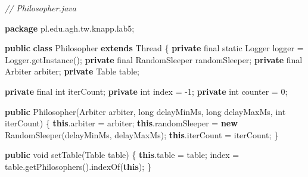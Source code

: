 \documentclass[11pt]{article}
\newenvironment{Shaded}{}{}
\newcommand{\KeywordTok}[1]{\textcolor[rgb]{0.00,0.44,0.13}{\textbf{{#1}}}}
\newcommand{\DataTypeTok}[1]{\textcolor[rgb]{0.56,0.13,0.00}{{#1}}}
\newcommand{\DecValTok}[1]{\textcolor[rgb]{0.25,0.63,0.44}{{#1}}}
\newcommand{\CommentTok}[1]{\textcolor[rgb]{0.38,0.63,0.69}{\textit{{#1}}}}
\newcommand{\FunctionTok}[1]{\textcolor[rgb]{0.02,0.16,0.49}{{#1}}}
\newcommand{\NormalTok}[1]{{#1}}
\newcommand{\ImportTok}[1]{{#1}}
\newcommand{\OperatorTok}[1]{\textcolor[rgb]{0.40,0.40,0.40}{{#1}}}
\newcommand{\BuiltInTok}[1]{{#1}}
\begin{document}
\begin{Shaded}
\begin{Highlighting}[]
\CommentTok{// Philosopher.java}

\KeywordTok{package}\ImportTok{ pl}\OperatorTok{.}\ImportTok{edu}\OperatorTok{.}\ImportTok{agh}\OperatorTok{.}\ImportTok{tw}\OperatorTok{.}\ImportTok{knapp}\OperatorTok{.}\ImportTok{lab5}\OperatorTok{;}

\KeywordTok{public} \KeywordTok{class}\NormalTok{ Philosopher }\KeywordTok{extends} \BuiltInTok{Thread} \OperatorTok{\{}
    \KeywordTok{private} \DataTypeTok{final} \DataTypeTok{static} \BuiltInTok{Logger}\NormalTok{ logger }\OperatorTok{=} \BuiltInTok{Logger}\OperatorTok{.}\FunctionTok{getInstance}\OperatorTok{();}
    \KeywordTok{private} \DataTypeTok{final}\NormalTok{ RandomSleeper randomSleeper}\OperatorTok{;}
    \KeywordTok{private} \DataTypeTok{final}\NormalTok{ Arbiter arbiter}\OperatorTok{;}
    \KeywordTok{private}\NormalTok{ Table table}\OperatorTok{;}

    \KeywordTok{private} \DataTypeTok{final} \DataTypeTok{int}\NormalTok{ iterCount}\OperatorTok{;}
    \KeywordTok{private} \DataTypeTok{int}\NormalTok{ index }\OperatorTok{=} \OperatorTok{{-}}\DecValTok{1}\OperatorTok{;}
    \KeywordTok{private} \DataTypeTok{int}\NormalTok{ counter }\OperatorTok{=} \DecValTok{0}\OperatorTok{;}

    \KeywordTok{public} \FunctionTok{Philosopher}\OperatorTok{(}\NormalTok{Arbiter arbiter}\OperatorTok{,} \DataTypeTok{long}\NormalTok{ delayMinMs}\OperatorTok{,} \DataTypeTok{long}\NormalTok{ delayMaxMs}\OperatorTok{,} \DataTypeTok{int}\NormalTok{ iterCount}\OperatorTok{)} \OperatorTok{\{}
        \KeywordTok{this}\OperatorTok{.}\FunctionTok{arbiter} \OperatorTok{=}\NormalTok{ arbiter}\OperatorTok{;}
        \KeywordTok{this}\OperatorTok{.}\FunctionTok{randomSleeper} \OperatorTok{=} \KeywordTok{new} \FunctionTok{RandomSleeper}\OperatorTok{(}\NormalTok{delayMinMs}\OperatorTok{,}\NormalTok{ delayMaxMs}\OperatorTok{);}
        \KeywordTok{this}\OperatorTok{.}\FunctionTok{iterCount} \OperatorTok{=}\NormalTok{ iterCount}\OperatorTok{;}
    \OperatorTok{\}}

    \KeywordTok{public} \DataTypeTok{void} \FunctionTok{setTable}\OperatorTok{(}\NormalTok{Table table}\OperatorTok{)} \OperatorTok{\{}
        \KeywordTok{this}\OperatorTok{.}\FunctionTok{table} \OperatorTok{=}\NormalTok{ table}\OperatorTok{;}
\NormalTok{        index }\OperatorTok{=}\NormalTok{ table}\OperatorTok{.}\FunctionTok{getPhilosophers}\OperatorTok{().}\FunctionTok{indexOf}\OperatorTok{(}\KeywordTok{this}\OperatorTok{);}
    \OperatorTok{\}}


\end{Highlighting}
\end{Shaded}
\end{document}
